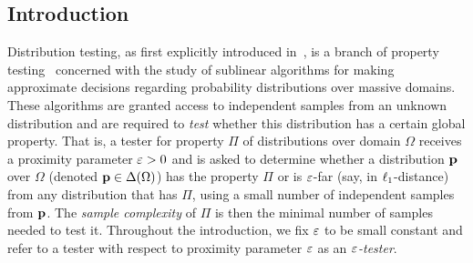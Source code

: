 \subsection{Introduction}\label{sec:introduction:communication}
Distribution testing, as first explicitly introduced in~\cite{BFRSW:00}, is a branch of property testing~\cite{RS:96,GGR:98} concerned with the study of sublinear algorithms for making approximate decisions regarding probability distributions over massive domains. These algorithms are granted access to independent samples from an unknown distribution and are required to \emph{test} whether this distribution has a certain global property. That is, a tester for property $\Pi$ of distributions over domain $\Omega$ receives a proximity parameter $\eps>0$ and is asked to determine whether a distribution $\p$ over $\Omega$ (denoted $\p\in\distribs{\Omega}$) has the property $\Pi$ or is $\eps$-far (say, in $\lp[1]$-distance) from any distribution that has $\Pi$, using a small number of independent samples from $\p$. The \emph{sample complexity} of $\Pi$ is then the minimal number of samples needed to test it. Throughout the introduction, we fix $\eps$ to be small constant and refer to a tester with respect to proximity parameter $\eps$ as an \emph{$\eps$-tester}.

